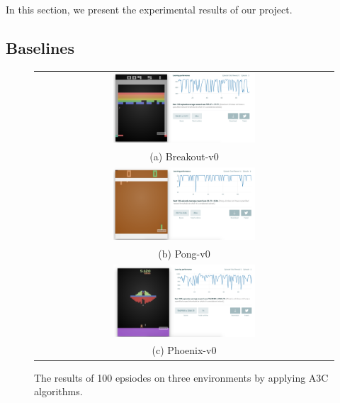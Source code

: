 

In this section, we present the experimental results of our project.


\subsection{Baselines}




\begin{figure}[h!]
\centering
\begin{tabular}{c}
\includegraphics[width=0.49\textwidth]{./fig/A3C_Breakout-v0.png} \\
(a) Breakout-v0 \\
\includegraphics[width=0.49\textwidth]{./fig/A3C_Pong-v0.png} \\
(b) Pong-v0 \\
\includegraphics[width=0.49\textwidth]{./fig/A3C_Phoenix-v0.png} \\
(c) Phoenix-v0 \\
\end{tabular}
\label{fig:A3C_baselines}
\caption{The results of 100 epsiodes on three environments by applying A3C algorithms.}
\end{figure}

